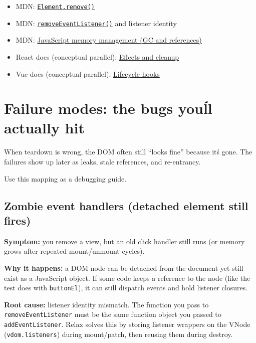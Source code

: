 \begin{itemize}
  \item MDN: \href{https://developer.mozilla.org/en-US/docs/Web/API/Element/remove}{\texttt{Element.remove()}}
  \item MDN: \href{https://developer.mozilla.org/en-US/docs/Web/API/EventTarget/removeEventListener}{\texttt{removeEventListener()}} and listener identity
  \item MDN: \href{https://developer.mozilla.org/en-US/docs/Web/JavaScript/Memory_Management}{JavaScript memory management (GC and references)}
  \item React docs (conceptual parallel): \href{https://react.dev/reference/react/useEffect#effects-and-cleanup}{Effects and cleanup}
  \item Vue docs (conceptual parallel): \href{https://vuejs.org/guide/essentials/lifecycle.html}{Lifecycle hooks}
\end{itemize}

\section{Failure modes: the bugs you\'ll actually hit}

When teardown is wrong, the DOM often still ``looks fine'' because it\'s gone.
The failures show up later as leaks, stale references, and re-entrancy.

Use this mapping as a debugging guide.

\subsection{Zombie event handlers (detached element still fires)}

	\textbf{Symptom:} you remove a view, but an old click handler still runs (or memory grows after repeated mount/unmount cycles).

	\textbf{Why it happens:} a DOM node can be detached from the document yet still exist as a JavaScript object.
If some code keeps a reference to the node (like the test does with \texttt{buttonEl}), it can still dispatch events and hold listener closures.

	\textbf{Root cause:} listener identity mismatch. The function you pass to \texttt{removeEventListener} must be the same function object you passed to \texttt{addEventListener}.
Relax solves this by storing listener wrappers on the VNode (\texttt{vdom.listeners}) during mount/patch, then reusing them during destroy.

